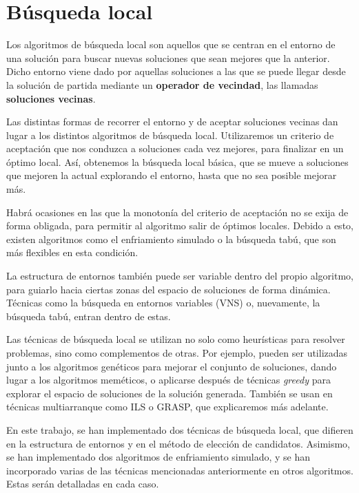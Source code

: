 \section{Búsqueda local}\label{busquedalocal}

Los algoritmos de búsqueda local son aquellos que se centran en el entorno de una
solución para buscar nuevas soluciones que sean mejores que la anterior. Dicho entorno
viene dado por aquellas soluciones a las que se puede llegar desde la solución de
partida mediante un \textbf{operador de vecindad}, las llamadas \textbf{soluciones vecinas}.

Las distintas formas de recorrer el entorno y de aceptar soluciones vecinas dan lugar
a los distintos algoritmos de búsqueda local. Utilizaremos un criterio de aceptación
que nos conduzca a soluciones cada vez mejores, para finalizar en un óptimo local.
Así, obtenemos la búsqueda local básica, que se mueve a soluciones que mejoren la
actual explorando el entorno, hasta que no sea posible mejorar más.

Habrá ocasiones en las que la monotonía del criterio de aceptación no se exija de
forma obligada, para permitir al algoritmo salir de óptimos locales. Debido a esto,
existen algoritmos como el enfriamiento simulado o la búsqueda tabú, que son más
flexibles en esta condición.

La estructura de entornos también puede ser variable dentro del propio algoritmo,
para guiarlo hacia ciertas zonas del espacio de soluciones de forma dinámica.
Técnicas como la búsqueda en entornos variables (VNS) o, nuevamente, la búsqueda tabú,
entran dentro de estas.

Las técnicas de búsqueda local se utilizan no solo como heurísticas para resolver
problemas, sino como complementos de otras. Por ejemplo, pueden ser utilizadas junto
a los algoritmos genéticos para mejorar el conjunto de soluciones, dando lugar a los
algoritmos meméticos, o aplicarse después de técnicas \textit{greedy} para explorar
el espacio de soluciones de la solución generada. También se usan en técnicas
multiarranque como ILS o GRASP, que explicaremos más adelante.

En este trabajo, se han implementado dos técnicas de búsqueda local, que difieren en
la estructura de entornos y en el método de elección de candidatos. Asimismo, se han
implementado dos algoritmos de enfriamiento simulado, y se han incorporado varias de
las técnicas mencionadas anteriormente en otros algoritmos. Estas serán detalladas en cada caso.

